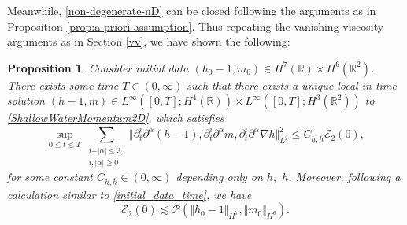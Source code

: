 \documentclass[reqno,11pt]{amsart}
\newcommand{\norm}[2]{\Vert #1 \Vert_{#2}}
\theoremstyle{plain}
\newtheorem{proposition}[theorem]{Proposition}
\theoremstyle{definition}
\numberwithin{equation}{section}
\begin{document}
Meanwhile, \eqref{non-degenerate-nD} can be closed following the arguments as in Proposition \ref{prop:a-priori-assumption}. Thus repeating the vanishing viscosity arguments as in Section \ref{vv}, we have shown the following: 
\begin{proposition}
\label{prop:2d-local-wellposedness}
    Consider initial data $(h_0-1,m_0)\in H^7(\mathbb{R}) \times H^6(\mathbb{R}^2)$. There exists some time $T\in (0,\infty)$ such that there exists a unique local-in-time solution $(h-1,m)\in L^{\infty}([0,T];H^4(\mathbb{R}))\times L^{\infty}([0,T];H^3(\mathbb{R}^2))$ to \eqref{ShallowWaterMomentum2D}, which satisfies
    \begin{equation}
        \sup_{0\leq t\leq T}\sum_{\substack{i+\vert\alpha\vert\leq 3, \\ i,\vert\alpha\vert\geq 0}} \norm{\partial_t^i\partial^{\alpha}(h-1),\partial_t^i\partial^{\alpha} m, \partial_t^i\partial^{\alpha}\nabla h}{L^2}^2 \leq C_{\underline{h},\overline{h}}\mathcal{E}_2(0),
    \end{equation}
    for some constant $C_{\underline{h},\overline{h}}\in (0,\infty)$ depending only on $\underline{h},$ $\overline{h}$. Moreover, following a calculation similar to \eqref{initial_data_time}, we have
    \begin{equation}
        \mathcal{E}_2(0)\lesssim \mathcal{P} (\norm{h_0-1}{H^7},\norm{m_0}{H^6}).
    \end{equation}
\end{proposition}
\end{document}
